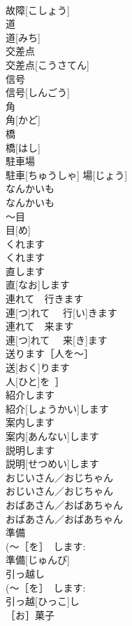 \documentclass[8pt]{extreport}
\begin{document}
\begin{CJK}{UTF8}{min}
\\	故障[こしょう]	
\\	道	
\\	道[みち]	
\\	交差点	
\\	交差点[こうさてん]	
\\	信号	
\\	信号[しんごう]	
\\	角	
\\	角[かど]	
\\	橋	
\\	橋[はし]	
\\	駐車場	
\\	駐車[ちゅうしゃ] 場[じょう]	
\\	なんかいも	
\\	なんかいも	
\\	～目	
\\	目[め]	
\\	くれます	
\\	くれます	
\\	直します	
\\	直[なお]します	
\\	連れて　行きます	
\\	連[つ]れて　 行[い]きます	
\\	連れて　来ます	
\\	連[つ]れて　 来[き]ます	
\\	送ります［人を～］	
\\	送[おく]ります
\\	人[ひと]を~］	
\\	紹介します	
\\	紹介[しょうかい]します	
\\	案内します	
\\	案内[あんない]します	
\\	説明します	
\\	説明[せつめい]します	
\\	おじいさん／おじちゃん	
\\	おじいさん／おじちゃん	
\\	おばあさん／おばあちゃん	
\\	おばあさん／おばあちゃん	
\\	準備	
\\	(～［を］　します: 
\\	準備[じゅんび]	
\\	引っ越し	
\\	(～［を］　します: 
\\	引っ越[ひっこ]し	
\\	［お］菓子	

\end{CJK}
\end{document}

